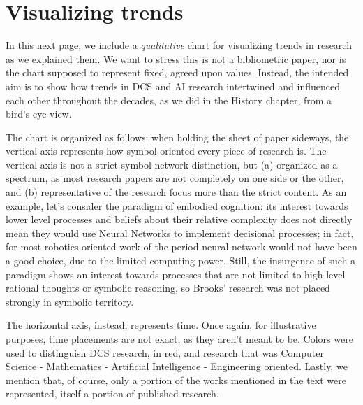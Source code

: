 \documentclass[../main.tex]{subfiles}
\begin{document}
\section{Visualizing trends}
In this next page, we include a \textit{qualitative} chart for visualizing trends in research as we explained them. We want to stress this is not a bibliometric paper, nor is the chart supposed to represent fixed, agreed upon values. Instead, the intended aim is to show how trends in DCS and AI research intertwined and influenced each other throughout the decades, as we did in the History chapter, from a bird's eye view.

The chart is organized as follows: when holding the sheet of paper sideways, the vertical axis represents how symbol oriented every piece of research is. The vertical axis is not a strict symbol-network distinction, but (a) organized as a spectrum, as most research papers are not completely on one side or the other, and (b) representative of the research focus more than the strict content. As an example, let's consider the paradigm of embodied cognition: its interest towards lower level processes and beliefs about their relative complexity does not directly mean they would use Neural Networks to implement decisional processes; in fact, for most robotics-oriented work of the period neural network would not have been a good choice, due to the limited computing power. Still, the insurgence of such a paradigm shows an interest towards processes that are not limited to high-level rational thoughts or symbolic reasoning, so Brooks' research was not placed strongly in symbolic territory.

The horizontal axis, instead, represents time. Once again, for illustrative purposes, time placements are not exact, as they aren't meant to be. Colors were used to distinguish DCS research, in red, and research that was Computer Science - Mathematics - Artificial Intelligence - Engineering oriented. Lastly, we mention that, of course, only a portion of the works mentioned in the text were represented, itself a portion of published research.

\newpage
\end{document}
